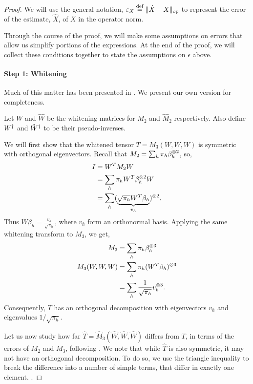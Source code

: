 \begin{proof}
We will use the general notation, $\varepsilon_{X} \stackrel{\rm def}{=} \|\hat X - X\|_{\textrm{op}}$
to represent the error of the estimate, $\hat X$, of $X$ in the operator
norm. 

Through the course of the proof, we will make some assumptions on errors
that allow us simplify portions of the expressions. At the end of
the proof, we will collect these conditions together to state the
assumptions on $\epsilon$ above.

\paragraph{Step 1: Whitening}
Much of this matter has been presented in \citet[Lemma 11, 12]{hsu13spherical}. We present our own version for completeness.

Let $W$ and $\hat W$ be the whitening matrices for $M_2$ and $\hat M_2$
respectively. Also define $W^{\dagger}$ and ${\hat W}^{\dagger}$ to be their
pseudo-inverses.

We will first show that the whitened tensor $T = M_3(W,W,W)$ is symmetric with orthogonal
eigenvectors. Recall that $M_2 = \sum_h \pi_h \beta_h^{\otimes 2}$, so,
\begin{align*}
  I 
    &= W^T M_2 W\\
    &= \sum_h \pi_h W^T \beta_h^{\otimes 2} W\\
    &= \sum_h (\underbrace{\sqrt{\pi_h} W^T \beta_h}_{v_h})^{\otimes 2}.
\end{align*}
Thus $W \beta_h = \frac{v_h}{\sqrt{\pi_h}}$,
where $v_h$ form an orthonormal
basis. Applying the same whitening transform to $M_3$, we get, 
\begin{align*}
  M_3 &= \sum_h \pi_h \beta_h^{\otimes 3} \\
  M_3(W,W,W) &= \sum_h \pi_h (W^T \beta_h)^{\otimes 3} \\
  &= \sum_h \frac{1}{\sqrt{\pi_h}} v_h^{\otimes 3}.
\end{align*}
Consequently, $T$ has an orthogonal decomposition with eigenvectors $v_h$ and eigenvalues $1/\sqrt{\pi_h}$.

Let us now study how far $\hat T = \hat M_3(\hat W, \hat W, \hat W)$ differs from $T$, in terms of the
errors of $M_2$ and $M_3$, following \citet{AnandkumarGeHsu2012}. We note that while $\hat T$ is also symmetric, it may not have an orthogonal decomposition. 
To do so, we use the triangle inequality to
break the difference into a number of simple terms, that differ in exactly one element. .


\end{proof}
